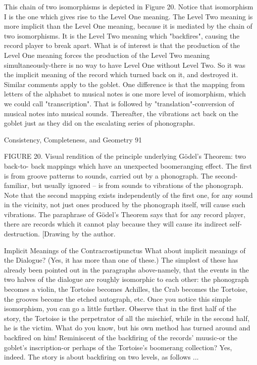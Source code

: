 This chain of two isomorphisms is depicted in Figure 20. Notice that isomorphism I is the
one which gives rise to the Level One meaning. The Level Two meaning is more implicit
than the Level One meaning, because it is mediated by the chain of two isomorphisms. It
is the Level Two meaning which "backfires", causing the record player to break apart.
What is of interest is that the production of the Level One meaning forces the production
of the Level Two meaning simultaneously-there is no way to have Level One without
Level Two. So it was the implicit meaning of the record which turned back on it, and
destroyed it.
         Similar comments apply to the goblet. One difference is that the mapping from
letters of the alphabet to musical notes is one more level of isomorphism, which we could
call "transcription". That is followed by "translation"-conversion of musical notes into
musical sounds. Thereafter, the vibrations act back on the goblet just as they did on the
escalating series of phonographs.




Consistency, Completeness, and Geometry                                                      91

FIGURE 20. Visual rendition of the principle underlying Gödel’s Theorem: two back-to-
back mappings which have an unexpected boomeranging effect. The first is from groove
patterns to sounds, carried out by a phonograph. The second-familiar, but usually
ignored -- is from sounds to vibrations of the phonograph. Note that the second mapping
exists independently of the first one, for any sound in the vicinity, not just ones produced
by the phonograph itself, will cause such vibrations. The paraphrase of Gödel’s Theorem
says that for any record player, there are records which it cannot play because they will
cause its indirect self-destruction. [Drawing by the author.



                    Implicit Meanings of the Contracrostipunctus
What about implicit meanings of the Dialogue? (Yes, it has more than one of these.) The
simplest of these has already been pointed out in the paragraphs above-namely, that the
events in the two halves of the dialogue are roughly isomorphic to each other: the
phonograph becomes a violin, the Tortoise becomes Achilles, the Crab becomes the
Tortoise, the grooves become the etched autograph, etc. Once you notice this simple
isomorphism, you can go a little further. Observe that in the first half of the story, the
Tortoise is the perpetrator of all the mischief, while in the second half, he is the victim.
What do you know, but his own method has turned around and backfired on him!
Reminiscent of the backfiring of the records' muusic-or the goblet's inscription-or perhaps
of the Tortoise's boomerang collection? Yes, indeed. The story is about backfiring on two
levels, as follows ...

